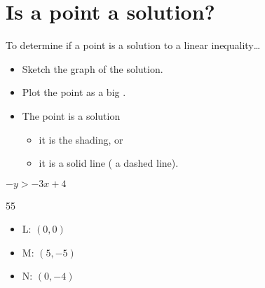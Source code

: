 \section{Is a point a solution?}

\begin{myConcept}{To determine if a point is a solution to a linear inequality\dots}
  \begin{itemize}[fullwidth]
    \item Sketch the graph of the solution.
    \item Plot the point as a big .
    \item The point {is} a solution 
    \begin{itemize}
      \item it is  the shading, or 
      \item it is  a solid line (  a dashed line).
    \end{itemize}
  \end{itemize}
\end{myConcept}



  {
    $-y > -3x+4$\\[4\onelineskip]
    \begin{minipage}{0.62\textwidth}
      \begin{myTikzpictureGrid}{0.5} {5}{5}
      \end{myTikzpictureGrid}
    \end{minipage}
    \begin{minipage}{0.36\textwidth}
      \begin{itemize}
        \item L: $(0,0)$
        \item M: $(5,-5)$
        \item N: $(0,-4)$
      \end{itemize}
    \end{minipage}
  }
    